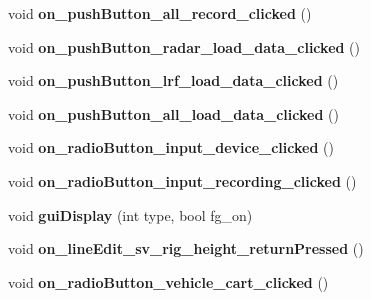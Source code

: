 \begin{DoxyCompactItemize}
\item 
\hypertarget{class_main_window_ae283ac8265a9f2dc657538b025816caf}{}void {\bfseries on\+\_\+push\+Button\+\_\+all\+\_\+record\+\_\+clicked} ()\label{class_main_window_ae283ac8265a9f2dc657538b025816caf}

\item 
\hypertarget{class_main_window_a67d164579f058b7440ca57bc4e239454}{}void {\bfseries on\+\_\+push\+Button\+\_\+radar\+\_\+load\+\_\+data\+\_\+clicked} ()\label{class_main_window_a67d164579f058b7440ca57bc4e239454}

\item 
\hypertarget{class_main_window_a775485da91e1a7881df26da46e1b9215}{}void {\bfseries on\+\_\+push\+Button\+\_\+lrf\+\_\+load\+\_\+data\+\_\+clicked} ()\label{class_main_window_a775485da91e1a7881df26da46e1b9215}

\item 
\hypertarget{class_main_window_a7a43507878165a191ab2cb0c5c54e7a4}{}void {\bfseries on\+\_\+push\+Button\+\_\+all\+\_\+load\+\_\+data\+\_\+clicked} ()\label{class_main_window_a7a43507878165a191ab2cb0c5c54e7a4}

\item 
\hypertarget{class_main_window_ab0fa89bb4e00c1be478235fdda546ea4}{}void {\bfseries on\+\_\+radio\+Button\+\_\+input\+\_\+device\+\_\+clicked} ()\label{class_main_window_ab0fa89bb4e00c1be478235fdda546ea4}

\item 
\hypertarget{class_main_window_ae1905865fb074ee77e57302045fc1bb5}{}void {\bfseries on\+\_\+radio\+Button\+\_\+input\+\_\+recording\+\_\+clicked} ()\label{class_main_window_ae1905865fb074ee77e57302045fc1bb5}

\item 
\hypertarget{class_main_window_aa2e7ff24d6dc395ba51fc15028ad83a5}{}void {\bfseries gui\+Display} (int type, bool fg\+\_\+on)\label{class_main_window_aa2e7ff24d6dc395ba51fc15028ad83a5}

\item 
\hypertarget{class_main_window_aa04baab889182db1e187583997dc22a7}{}void {\bfseries on\+\_\+line\+Edit\+\_\+sv\+\_\+rig\+\_\+height\+\_\+return\+Pressed} ()\label{class_main_window_aa04baab889182db1e187583997dc22a7}

\item 
\hypertarget{class_main_window_afc577ecbf5b4800cf1a25edc46bfea54}{}void {\bfseries on\+\_\+radio\+Button\+\_\+vehicle\+\_\+cart\+\_\+clicked} ()\label{class_main_window_afc577ecbf5b4800cf1a25edc46bfea54}


\end{DoxyCompactItemize}
